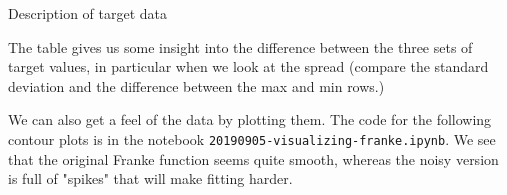\documentclass{article}
\begin{document}
\begin{table}[h]
    \label{tab:description}
    \caption{Description of target data}
\end{table}

The table gives us some insight into the difference between the three sets of target values, in particular when we look at the spread (compare the standard deviation and the difference between the max and min rows.)

We can also get a feel of the data by plotting them. The code for the following contour plots is in the notebook \texttt{20190905-visualizing-franke.ipynb}. We see that the original Franke function seems quite smooth, whereas the noisy version is full of "spikes" that will make fitting harder.
\end{document}
